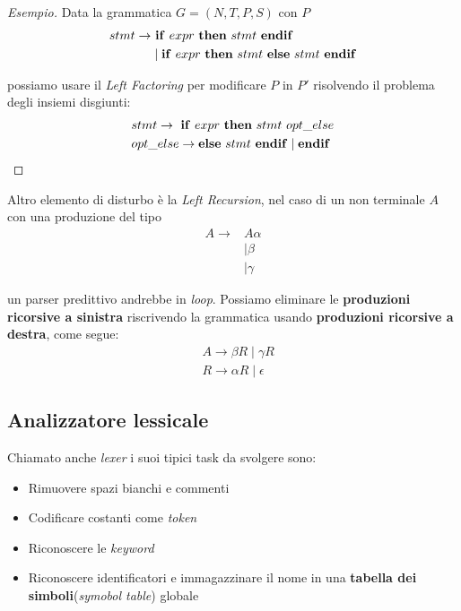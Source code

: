 \begin{proof}[Esempio]
Data la grammatica $G = (N,T,P,S)$ con $P$
\begin{align*}
  stmt \to
  & \ \text{\textbf{if}} \ expr \ \text{\textbf{then}} \
    stmt \ \text{\textbf{endif}} \\
  & \mid \text{\textbf{if}} \ expr \ \text{\textbf{then}} \ stmt \
    \text{\textbf{else}} \ stmt \ \text{\textbf{endif}}
\end{align*}

possiamo usare il \textit{Left Factoring} per modificare $P$ in $P'$ risolvendo
il problema degli insiemi disgiunti:
\begin{align*}
& stmt \to \ \text{\textbf{if}} \ expr \ \text{\textbf{then}} \ stmt \
             opt\_else \\
& opt\_else \to \text{\textbf{else}} \ stmt \ \text{\textbf{endif}}
                \mid \text{\textbf{endif}}
\end{align*}
\end{proof}

Altro elemento di disturbo è la \textit{Left Recursion}, nel caso di un non
terminale $A$ con una produzione del tipo
\begin{align*}
A \to & A \alpha \\
      & \mid \beta \\
      & \mid \gamma
\end{align*}

un parser predittivo andrebbe in \textit{loop}. Possiamo eliminare le
\textbf{produzioni ricorsive a sinistra} riscrivendo la grammatica usando
\textbf{produzioni ricorsive a destra}, come segue:
\begin{align*}
& A \to \beta R \mid \gamma R  \\
& R \to \alpha R \mid \epsilon
\end{align*}

\subsection{Analizzatore lessicale}
\label{sec:analizzatore_lessicale}
Chiamato anche \textit{lexer} i suoi tipici task da svolgere sono:
\begin{itemize}
\item Rimuovere spazi bianchi e commenti
\item Codificare costanti come \textit{token}
\item Riconoscere le \textit{keyword}
\item Riconoscere identificatori e immagazzinare il nome in una
\textbf{tabella dei simboli}(\textit{symobol table}) globale
\end{itemize}

